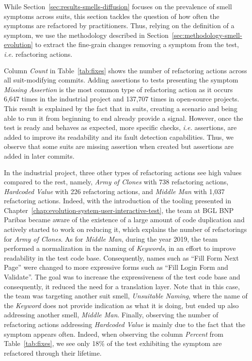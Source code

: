 While Section~\ref{sec:results-smells-diffusion} focuses on the prevalence of smell symptoms across \gls{suit}s, this section tackles the question of how often the symptoms are refactored by practitioners. Thus, relying on the definition of a symptom, we use the methodology described in Section~\ref{sec:methodology-smell-evolution} to extract the fine-grain changes removing a symptom from the test, \emph{i.e.} refactoring actions.

Column \emph{Count} in Table~\ref{tab:fixes} shows the number of refactoring actions across all \gls{suit}-modifying commits. Adding assertions to tests presenting the symptom \emph{Missing Assertion} is the most common type of refactoring action as it occurs 6,647 times in the industrial project and 137,707 times in open-source projects. This result is explained by the fact that in \gls{suit}s, creating a scenario and being able to run it from beginning to end already provide a signal. However, once the test is ready and behaves as expected, more specific checks, \emph{i.e.} assertions, are added to improve its readability and its fault detection capabilities. Thus, we observe that some \gls{suit}s are missing assertion when created but assertions are added in later commits. 

In the industrial project, three other types of refactoring actions see high values compared to the rest, namely, \emph{Army of Clones} with 738 refactoring actions, \emph{Hardcoded Value} with 226 refactoring actions, and \emph{Middle Man} with 1,037 refactoring actions. Indeed, with the introduction of the tooling presented in Chapter~\ref{chap:evolution-system-user-interactive-test}, the team at BGL BNP Paribas became aware of the existence of a large amount of code duplication and actively started to work on reducing it, which explains the number of refactorings for \emph{Army of Clones}. As for \emph{Middle Man}, during the year 2019, the team performed a normalization in the naming of \emph{Keywords}, in an effort to improve readability in the test code base. Consequently, names such as ``Fill Form Next Page'' were changed to more expressive forms such as ``Fill Login Form and Validate''. The goal was to increase the expressiveness of the test code base and consequently, it reduced the need for a translation layer. Note that in this case, the team was targeting another \gls{suit} smell, \emph{Unsuitable Naming}, where the name of the \emph{Keyword} does not provide indication as what it is doing, but ended up also addressing another smell, \emph{Middle Man}. Finally, observing the number of refactoring actions addressing \emph{Hardcoded Value} is mainly due to the fact that the symptom appears often. Indeed, when observing the column \emph{Percent} from Table~\ref{tab:fixes}, we see only 18\% of the test exhibiting the symptom are refactored through their lifetime. 

